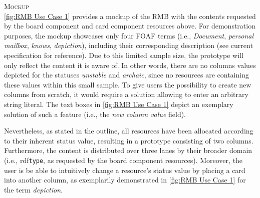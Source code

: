 \noindent \textsc{Mockup}\\
\noindent \autoref{fig:RMB Use Case 1} provides a mockup of the \acrshort*{RMB} with the contents requested by the board component and card component resources above. For demonstration purposes, the mockup showcases only four \acrshort*{FOAF} terms (i.e., \textit{Document}, \textit{personal mailbox}, \textit{knows}, \textit{depiction}), including their corresponding description (see current specification for reference). Due to this limited sample size, the prototype will only reflect the content it is aware of. In other words, there are no columns values depicted for the statuses \textit{unstable} and \textit{archaic}, since no resources are containing these values within this small sample. To give users the possibility to create new columns from scratch, it would require a solution allowing to enter an arbitrary string literal. The text boxes in \autoref{fig:RMB Use Case 1} depict an exemplary solution of such a feature (i.e., the \textit{new column value} field).

Nevertheless, as stated in the outline, all resources have been allocated according to their inherent status value, resulting in a prototype consisting of two columns. Furthermore, the content is distributed over three lanes by their broader domain (i.e., \acrshort{rdf}\texttt{type}, as requested by the board component resources). Moreover, the user is be able to intuitively change a resource’s status value by placing a card into another column, as exemplarily demonstrated in \autoref{fig:RMB Use Case 1} for the term \textit{depiction}.


